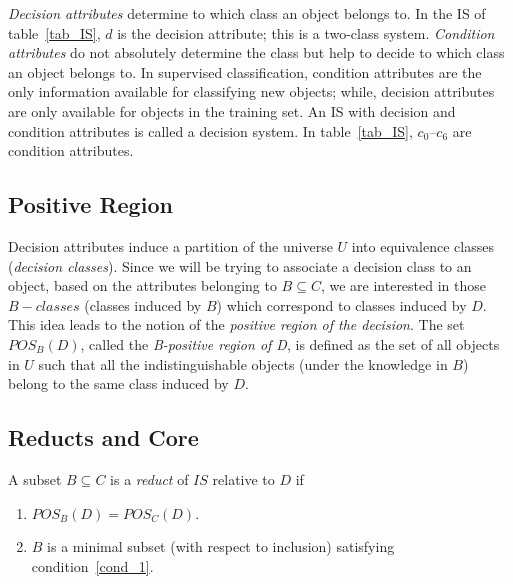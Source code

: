 \documentclass[authoryear,preprint,review,12pt]{elsarticle}
\begin{document}
   
  \textit{Decision attributes} determine to which class an object belongs to. In the IS of
  table~\ref{tab_IS}, $d$ is the decision attribute; this is a two-class system. \textit{Condition attributes} 
  do not absolutely determine the class but help to decide to which class an object belongs to. In supervised 
  classification, condition attributes are the only information available for classifying new objects; while, 
  decision attributes are only available for objects in the training set. An IS with decision and 
  condition attributes is called a decision system. In table~\ref{tab_IS}, $c_0$--$c_6$ are condition 
  attributes.
  
\subsection{Positive Region}\label{subsect_Pos}
  Decision attributes induce a partition of the universe $U$ into equivalence classes 
  (\textit{decision classes}). Since we will be trying to associate a decision class to an object, 
  based on the attributes belonging to $B \subseteq C$, we are interested in those 
  $B-classes$ (classes induced by $B$) which correspond to classes induced by $D$. 
  This idea leads to the notion of the  \textit{positive region of the decision}. The set $POS_B(D)$, 
  called the \textit{B-positive region of D}, is defined as the set of all objects in $U$ such 
  that all the indistinguishable objects (under the knowledge in $B$) belong to the same class induced 
  by $D$.
%  
%  
 
\subsection{Reducts and Core}\label{def_reduct}
  A subset $B \subseteq C$ is a \textit{reduct} of $IS$ relative to $D$ if
  \begin{enumerate}
  	\item $POS_B(D)=POS_C(D)$. \label{cond_1}
  	\item $B$ is a minimal subset (with respect to inclusion) satisfying condition~\ref{cond_1}.\label{cond_2}
  \end{enumerate}
\end{document}

